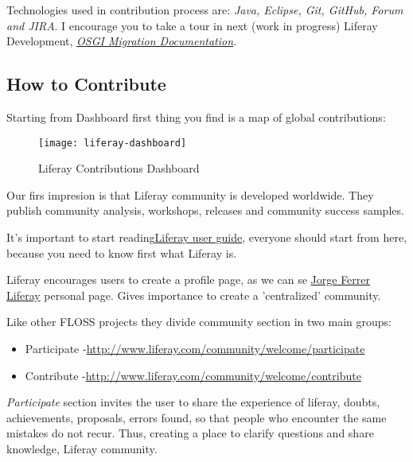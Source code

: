 \par Technologies used in contribution process are: \textit{Java, Eclipse, Git, GitHub, Forum and JIRA}. I encourage you to take a tour in next (work in progress) Liferay Development, \textit{\href{http://www.liferay.com/es/documentation/liferay-portal/6.1/user-guide/-/ai/osgi}{OSGI Migration Documentation}.}

\subsection{How to Contribute}

\par Starting from Dashboard first thing you find is a map of global contributions:

\begin{figure}[htp]
\centering
\texttt{[image: liferay-dashboard]}
\caption{Liferay Contributions Dashboard}
\label{dashboard}
\end{figure}

\par Our firs impresion is that Liferay community is developed worldwide. They publish community analysis, workshops, releases and community success samples.

\par It's important to start reading\href{http://www.liferay.com/documentation/liferay-portal/6.1/user-guide}{Liferay user guide}, everyone should start from here, because you need to know first what Liferay is.

\par Liferay encourages users to create a profile page, as we can se \href{http://www.liferay.com/web/jorge.ferrer/profile}{Jorge Ferrer Liferay} personal page. Gives importance to create a 'centralized' community.

\par Like other FLOSS projects they divide community section in two main groups:

\begin{itemize}
	\item Participate -\href{http://www.liferay.com/community/welcome/participate}{http://www.liferay.com/community/welcome/participate}
	\item Contribute -\href{http://www.liferay.com/community/welcome/contribute}{http://www.liferay.com/community/welcome/contribute}
\end{itemize}

\par \textit{Participate} section invites the user to share the experience of liferay, doubts, achievements, proposals, errors found, so that people who encounter the same mistakes do not recur. Thus, creating a place to clarify questions and share knowledge, Liferay community.

